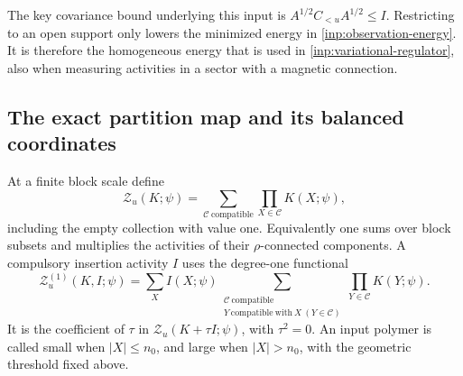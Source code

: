 The key covariance bound underlying this input is
\(A^{1/2}C_{<u}A^{1/2}\le I\).  Restricting to an open support
only lowers the minimized energy in \eqref{inp:observation-energy}.
It is therefore the homogeneous energy that is used in
\eqref{inp:variational-regulator}, also when measuring activities in
a sector with a magnetic connection.

\subsection{The exact partition map and its balanced coordinates}

At a finite block scale define
\begin{equation}\label{inp:partition-function}
 \mathcal Z_u(K;\psi)=
 \sum_{\mathcal C\ \mathrm{compatible}}\prod_{X\in\mathcal C}K(X;\psi),
\end{equation}
including the empty collection with value one.  Equivalently one sums
over block subsets and multiplies the activities of their
\(\rho\)-connected components.  A compulsory insertion activity
\(I\) uses the degree-one functional
\begin{equation}\label{inp:insertion-partition}
 \mathcal Z_u^{(1)}(K,I;\psi)=
 \sum_X I(X;\psi)
 \sum_{\substack{\mathcal C\ \mathrm{compatible}\\
                  Y\ \mathrm{compatible\ with}\ X\ (Y\in\mathcal C)}}
                                      \prod_{Y\in\mathcal C}K(Y;\psi).
\end{equation}
It is the coefficient of \(\tau\) in
\(\mathcal Z_u(K+\tau I;\psi)\), with \(\tau^2=0\).
An input polymer is called small when \(|X|\le n_0\), and large
when \(|X|>n_0\), with the geometric threshold fixed above.

